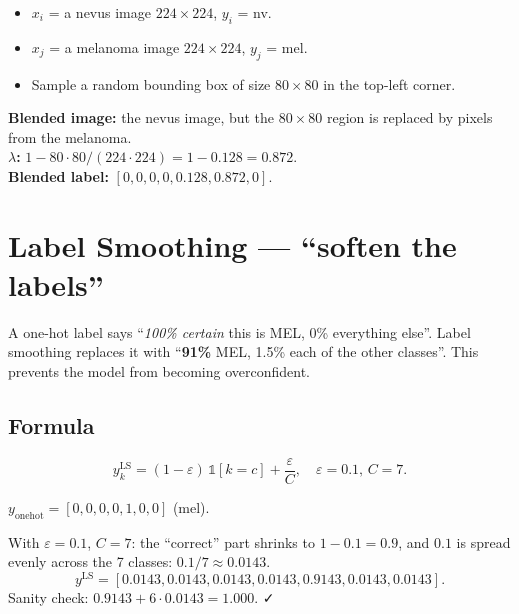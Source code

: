 \documentclass[11pt,a4paper]{article}
\begin{document}
\begin{example}
\begin{itemize}[leftmargin=*]
  \item $x_i$ = a nevus image $224\times 224$, $y_i$ = nv.
  \item $x_j$ = a melanoma image $224\times 224$, $y_j$ = mel.
  \item Sample a random bounding box of size $80 \times 80$ in the top-left corner.
\end{itemize}
\textbf{Blended image:} the nevus image, but the $80 \times 80$ region is replaced by pixels from the melanoma.\\
\textbf{$\lambda$:} $1 - 80 \cdot 80 / (224 \cdot 224) = 1 - 0.128 = 0.872$.\\
\textbf{Blended label:} $[0,0,0,0,\mathbf{0.128},\mathbf{0.872},0]$.
\end{example}

\section{Label Smoothing --- ``soften the labels''}

\begin{simple}
A one-hot label says ``\textit{100\% certain} this is MEL, 0\% everything else''. Label smoothing replaces it with ``\textbf{91\%} MEL, 1.5\% each of the other classes''. This prevents the model from becoming overconfident.
\end{simple}

\subsection{Formula}

\[
  y^{\text{LS}}_k = (1 - \varepsilon) \, \mathbb{1}[k = c] + \frac{\varepsilon}{C}, \quad \varepsilon = 0.1, \, C = 7.
\]

\begin{example}
$y_{\text{onehot}} = [0,0,0,0,1,0,0]$ (mel).

With $\varepsilon = 0.1$, $C = 7$: the ``correct'' part shrinks to $1 - 0.1 = 0.9$, and $0.1$ is spread evenly across the 7 classes: $0.1 / 7 \approx 0.0143$.
\[
  y^{\text{LS}} = [\mathbf{0.0143}, 0.0143, 0.0143, 0.0143, \mathbf{0.9143}, 0.0143, 0.0143].
\]
Sanity check: $0.9143 + 6 \cdot 0.0143 = 1.000$. ✓
\end{example}
\end{document}

